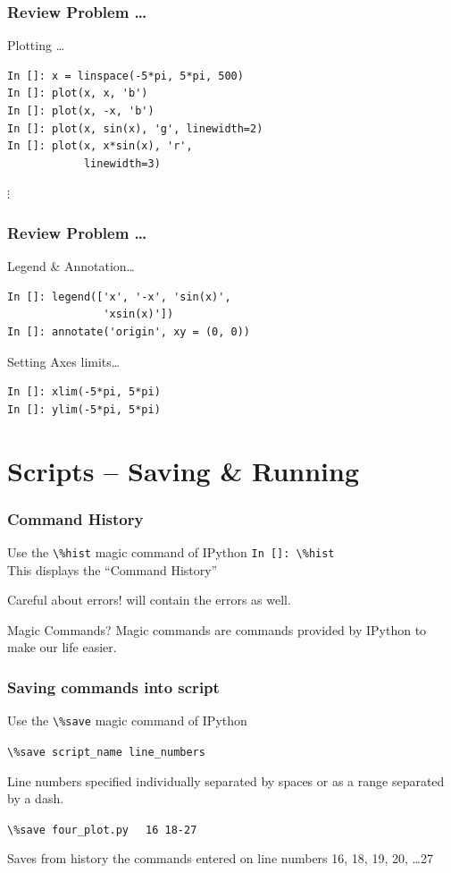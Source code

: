 \documentclass[14pt,compress]{beamer}
\newcounter{time}
\newcommand{\inctime}[1]{\addtocounter{time}{#1}{\tiny \thetime\ m}}
\newcommand{\typ}[1]{\lstinline{#1}}
\newcommand{\kwrd}[1]{ \texttt{\textbf{\color{blue}{#1}}}  }
\begin{document}
\begin{frame}[fragile]
\frametitle{Review Problem \ldots}
\alert{Plotting \ldots}
\begin{lstlisting}
In []: x = linspace(-5*pi, 5*pi, 500)
In []: plot(x, x, 'b')
In []: plot(x, -x, 'b')
In []: plot(x, sin(x), 'g', linewidth=2)
In []: plot(x, x*sin(x), 'r',
            linewidth=3)
\end{lstlisting}
$\vdots$
\end{frame}

\begin{frame}[fragile]
\frametitle{Review Problem \ldots}
\alert{Legend \& Annotation\ldots}
\begin{lstlisting}
In []: legend(['x', '-x', 'sin(x)',
               'xsin(x)'])
In []: annotate('origin', xy = (0, 0))
\end{lstlisting}
\alert{Setting Axes limits\ldots}
\begin{lstlisting}
In []: xlim(-5*pi, 5*pi)
In []: ylim(-5*pi, 5*pi)
\end{lstlisting}
\inctime{5}
\end{frame}

\section{Scripts -- Saving \& Running}
\begin{frame}[fragile]
\frametitle{Command History}
Use the \typ{\%hist} \alert{magic} command of IPython
\typ{In []: \%hist}\\
This displays the ``Command History''
\begin{block}{Careful about errors!}
  \kwrd{\%hist} will contain the errors as well.\\
\end{block}
\pause
\begin{block}{Magic Commands?}
  Magic commands are commands provided by IPython to make our life easier.
\end{block}
\end{frame}

\begin{frame}[fragile]
  \frametitle{Saving commands into script}
Use the \typ{\%save} \alert{magic} command of IPython
\begin{block}{}
\typ{\%save script_name line_numbers}
\end{block}
Line numbers specified individually separated by spaces or as a range separated by a dash.\\
\begin{block}{}
\typ{\%save four_plot.py} \alert{\typ{  16 18-27}} \\
\end{block}
Saves from history the commands entered on line numbers \alert{16, 18, 19, 20, \ldots 27}
\end{frame}
\end{document}
